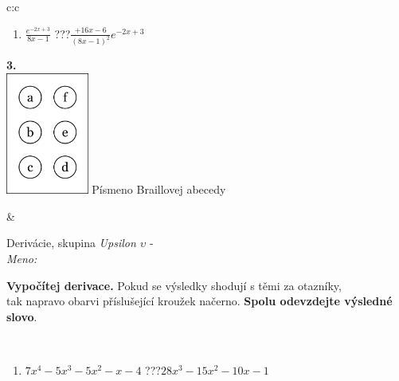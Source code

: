 \documentclass[10pt]{report}
\begin{document}
\begin{tabular}{c:c}
\begin{minipage}[c][104.5mm][t]{0.5\linewidth}
\begin{center}
\begin{minipage}{0.79\linewidth}
\begin{center}
\begin{varwidth}{\linewidth}
\begin{enumerate}
\item $\frac{e^{-2x+3}}{8x-1}$\quad \dotfill\; ???\;\dotfill \quad $\frac{+16x-6}{(8x-1)^2}e^{-2x+3}$
\end{enumerate}
\end{varwidth}
\end{center}
\end{minipage}
\begin{minipage}{0.20\linewidth}
\begin{center}
{\Huge\bfseries 3.} \\[2mm]
\includegraphics[height=40mm]{../images/braille.png}
{\small Písmeno Braillovej abecedy}
\end{center}
\end{minipage}
\end{center}
\end{minipage}
&
\begin{minipage}[c][104.5mm][t]{0.5\linewidth}
\begin{center}
\vspace{7mm}
{\huge Derivácie, skupina \textit{Upsilon $\upsilon$} -}\\[5mm]
\textit{Meno:}\phantom{xxxxxxxxxxxxxxxxxxxxxxxxxxxxxxxxxxxxxxxxxxxxxxxxxxxxxxxxxxxxxxxxx}\\[5mm]
\begin{minipage}{0.95\linewidth}
\begin{center}
\textbf{Vypočítej derivace.} Pokud se výsledky shodují s těmi za otazníky,\\tak napravo obarvi příslušející kroužek načerno. \textbf{Spolu odevzdejte výsledné slovo}.
\end{center}
\end{minipage}
\\[1mm]
\begin{minipage}{0.79\linewidth}
\begin{center}
\begin{varwidth}{\linewidth}
\begin{enumerate}
\normalsize
\item $7x^4-5x^3-5x^2-x-4$\quad \dotfill\; ???\;\dotfill \quad $28x^3-15x^2-10x-1$

\end{enumerate}
\end{varwidth}
\end{center}
\end{minipage}
\end{center}
\end{minipage}
\end{tabular}
\end{document}
